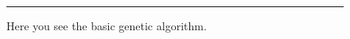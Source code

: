 \begin{figure}[htbp]
\begin{center}
\begin{varwidth}{\textwidth}
\end{varwidth}
\end{center}
\centering
\rule{35em}{0.5pt}
\caption[Basic GA]{Here you see the basic genetic algorithm.}
\label{fig:ga}
\end{figure}


